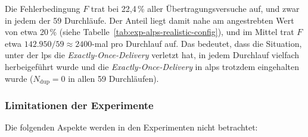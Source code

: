 Die Fehlerbedingung $F$ trat bei 22{,}4\,\% aller Übertragungsversuche auf, und zwar in jedem der 59 Durchläufe. Der Anteil liegt damit nahe am angestrebten Wert von etwa 20\,\% (siehe Tabelle~\ref{tab:exp-alps-realistic-config}), und im Mittel trat $F$ etwa $142.950 / 59 \approx 2400$-mal pro Durchlauf auf. Das bedeutet, dass die Situation, unter der \gls{lps} die \textit{Exactly-Once-Delivery} verletzt hat, in jedem Durchlauf vielfach herbeigeführt wurde und die \textit{Exactly-Once-Delivery} in \gls{alps} trotzdem eingehalten wurde ($N_{\text{dup}} = 0$ in allen 59 Durchläufen).

\subsubsection{Limitationen der Experimente}
\label{sub-sub:exp-alps-limitationen}

Die folgenden Aspekte werden in den Experimenten nicht betrachtet:

